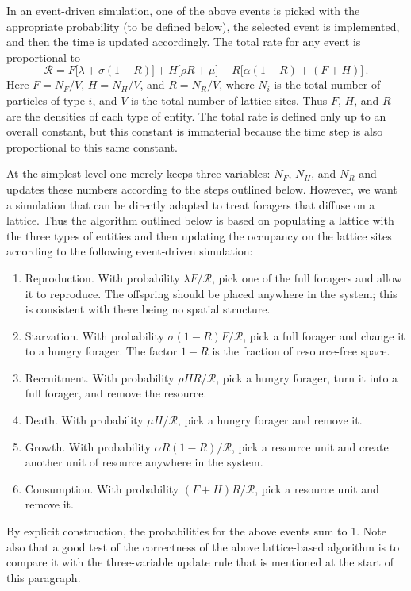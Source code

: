 \documentclass[11pt]{iopart}
\begin{document}
In an event-driven simulation, one of the above events is picked with the
appropriate probability (to be defined below), the selected event is
implemented, and then the time is updated accordingly.  The total rate for
any event is proportional to
\begin{equation}
\mathcal{R}=F\big[\lambda +\sigma(1-R)\big]+ H\big[\rho R+\mu\big]+
R\big[\alpha(1-R)+(F+H)\big]\,.
\end{equation}
Here $F=N_F/V$, $H=N_H/V$, and $R=N_R/V$, where $N_i$ is the total number of
particles of type $i$, and $V$ is the total number of lattice sites.  Thus $F$,
$H$, and $R$ are the densities of each type of entity.  The
total rate is defined only up to an overall constant, but this constant is
immaterial because the time step is also proportional to this same constant.

At the simplest level one merely keeps three variables: $N_F$, $N_H$, and
$N_R$ and updates these numbers according to the steps outlined below.
However, we want a simulation that can be directly adapted to treat foragers
that diffuse on a lattice.  Thus the algorithm outlined below is based on
populating a lattice with the three types of entities and then updating the
occupancy on the lattice sites according to the following event-driven
simulation:
\begin{enumerate}
\item Reproduction.  With probability $\lambda F/\mathcal{R}$, pick one of
  the full foragers and allow it to reproduce.  The offspring should be
  placed anywhere in the system; this is consistent with there being no
  spatial structure.
\item Starvation.  With probability $\sigma(1-R)F/\mathcal{R}$, pick a full
  forager and change it to a hungry forager.  The factor $1-R$ is the
  fraction of resource-free space.
\item Recruitment.  With probability $\rho HR/\mathcal{R}$, pick a hungry
  forager, turn it into a full forager, and remove the resource.
\item Death.  With probability $\mu H/\mathcal{R}$, pick a hungry forager and
  remove it.
\item Growth.  With probability $\alpha R(1-R)/\mathcal{R}$, pick a resource
  unit and create another unit of resource anywhere in the system.
\item Consumption.  With probability $(F+H)R/\mathcal{R}$, pick a resource
  unit and remove it.
\end{enumerate}
By explicit construction, the probabilities for the above events sum to 1.
Note also that a good test of the correctness of the above lattice-based
algorithm is to compare it with the three-variable update rule that is
mentioned at the start of this paragraph.
\end{document}

